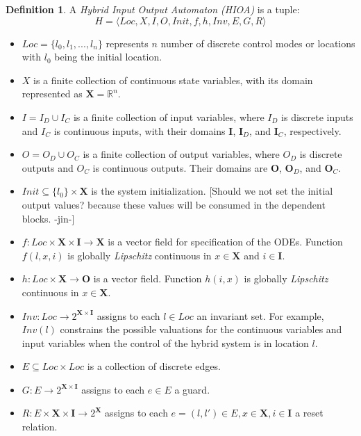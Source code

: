 \documentclass[twoside,a4paper,12pt]{article}
\newcommand{\jin}[1]{{\textsf{\color{red} \small{[#1 -jin-]}}}}
\theoremstyle{definition}
\newtheorem{definition}{Definition}
\begin{document}
	
\begin{definition}
	A \emph{Hybrid Input Output Automaton (HIOA)} is a tuple:
	\begin{equation}
	H = \langle Loc, X, I, O, Init, f, h, Inv, E, G, R \rangle
	\end{equation}
	\begin{itemize}
		\item $Loc = \{ l_0, l_1, ... , l_n\}$ represents $n$ number of discrete
		control modes or locations with $l_0$ being the initial location.
		\item $X$ is a finite collection of continuous state variables, with its domain represented as $\mathbf{X} = \mathbb{R}^n$.
		\item $I = I_D \cup I_C$ is a finite collection of input variables, where $I_D$ is discrete inputs and $I_C$ is continuous inputs, with their domains $\mathbf{I}$, $\mathbf{I}_D$, and $\mathbf{I}_C$, respectively.
		\item $O = O_D \cup O_C$ is a finite collection of output variables, where
		$O_D$ is discrete outputs and $O_C$ is continuous outputs. Their domains are $\mathbf{O}$, $\mathbf{O}_D$, and $\mathbf{O}_C$.
		\item $Init \subseteq \{l_0\} \times \mathbf{X}$ is the system initialization. \jin{Should we not set the initial output values? because these values will be consumed in the dependent blocks.}
		\item $f:Loc \times \mathbf{X} \times \mathbf{I} \rightarrow \mathbf{X}$ is a vector field for specification of the ODEs. Function $f(l,x,i)$ is globally \emph{Lipschitz} continuous in $x \in \mathbf{X}$ and $i \in \mathbf{I}$.
		\item $h : Loc \times \mathbf{X} \rightarrow \mathbf{O}$ is a vector field. Function $h(i,x)$ is globally \emph{Lipschitz} continuous in $ x\in \mathbf{X}$.
		\item $Inv : Loc \rightarrow 2^{ \mathbf{X} \times \mathbf{I} }$ assigns to each $l \in Loc$ an invariant set. For example, $Inv(l)$ constrains the possible valuations for the continuous variables and input variables when the control of the hybrid system is in location $l$.
		\item $E \subseteq Loc \times Loc$ is a collection of discrete edges.
		\item $G : E \rightarrow 2^{ \mathbf{X} \times \mathbf{I} }$ assigns to each $e \in E$ a guard.
		\item $R : E \times \mathbf{X} \times \mathbf{I} \rightarrow 2^{\mathbf{X}}$ assigns to each $e = (l,l')\in E, x\in \mathbf{X}, i \in \mathbf{I}$ a reset relation.
	\end{itemize}
	\label{def:HIOA}
\end{definition}
\end{document}
